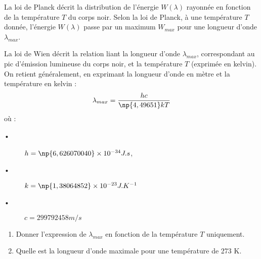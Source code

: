 
La loi de Planck décrit la distribution de l'énergie $W(\lambda)$ rayonnée en fonction de la température $T$ du corps noir. Selon la loi de Planck, à une température $T$ donnée, l'énergie $W(\lambda)$ passe par un maximum $W_{max}$ pour une longueur d'onde $\lambda_{max}$. 

La loi de Wien décrit la relation liant la longueur d'onde  $\lambda_{max}$, correspondant au pic d'émission lumineuse du corps noir, et la température $T$ (exprimée en kelvin). On retient généralement, en exprimant la longueur d'onde en mètre et la température en kelvin : $$\lambda_{max} = \frac{hc}{\np{4,49651} kT}$$ où :

\begin{description}
\item[•] $h=\np{6,626 070 040} \times 10^{-34} J.s$,
\item[•] $k=\np{1,38064852} \times 10^{-23} J.K^{-1}$
\item[•] $c=299 792 458 m/s$
\end{description}

 
\begin{enumerate}
\item Donner l'expression de $\lambda_{max}$ en fonction de la température $T$ uniquement.
\item Quelle est la longueur d'onde maximale pour une température de 273 K.
\end{enumerate}